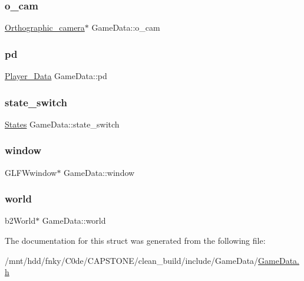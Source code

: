 \subsubsection{\texorpdfstring{o\+\_\+cam}{o\_cam}}
{\footnotesize\ttfamily \hyperlink{classOrthographic__camera}{Orthographic\+\_\+camera}$\ast$ Game\+Data\+::o\+\_\+cam}

\mbox{\label{structGameData_a698738ca3ba6be3f74700c589c63fb3d}} 
\subsubsection{\texorpdfstring{pd}{pd}}
{\footnotesize\ttfamily \hyperlink{structPlayer__Data}{Player\+\_\+\+Data} Game\+Data\+::pd}

\mbox{\label{structGameData_a210154898f11f1d892bd37644290af74}} 
\subsubsection{\texorpdfstring{state\+\_\+switch}{state\_switch}}
{\footnotesize\ttfamily \hyperlink{GameData_8h_a808e5cd4979462d3bbe3070d7d147444}{States} Game\+Data\+::state\+\_\+switch}

\mbox{\label{structGameData_af9735787501e4c8c1d26787c322cd6dd}} 
\subsubsection{\texorpdfstring{window}{window}}
{\footnotesize\ttfamily G\+L\+F\+Wwindow$\ast$ Game\+Data\+::window}

\mbox{\label{structGameData_a937e7f0334daf0f54ae28d7b92e7cca6}} 
\subsubsection{\texorpdfstring{world}{world}}
{\footnotesize\ttfamily b2\+World$\ast$ Game\+Data\+::world}



The documentation for this struct was generated from the following file\+:\begin{DoxyCompactItemize}
\item 
/mnt/hdd/fnky/\+C0de/\+C\+A\+P\+S\+T\+O\+N\+E/clean\+\_\+build/include/\+Game\+Data/\hyperlink{GameData_8h}{Game\+Data.\+h}\end{DoxyCompactItemize}
